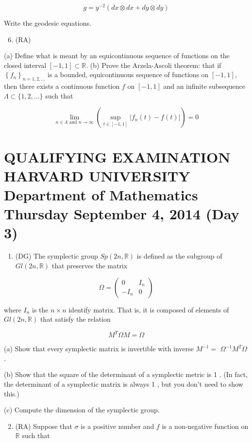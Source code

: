 \documentclass[10pt]{article}
\begin{document}
$$
g=y^{-2}(d x \otimes d x+d y \otimes d y)
$$

Write the geodesic equations.

\begin{enumerate}
  \setcounter{enumi}{5}
  \item (RA)
\end{enumerate}

(a) Define what is meant by an equicontinuous sequence of functions on the closed interval $[-1,1] \subset \mathbb{R}$.
(b) Prove the Arzela-Ascoli theorem: that if $\left\{f_{n}\right\}_{n=1,2, \ldots}$ is a bounded, equicontinuous sequence of functions on $[-1,1]$, then there exists a continuous function $f$ on $[-1,1]$ and an infinite subsequence $\Lambda \subset\{1,2, \ldots\}$ such that

$$
\lim _{n \in \Lambda \text { and } n \rightarrow \infty}\left(\sup _{t \in[-1,1]}\left|f_{n}(t)-f(t)\right|\right)=0
$$

\section{QUALIFYING EXAMINATION 
 HARVARD UNIVERSITY 
 Department of Mathematics 
 Thursday September 4, 2014 (Day 3)}
\begin{enumerate}
  \item (DG) The symplectic group $S p(2 n, \mathbb{R})$ is defined as the subgroup of $G l(2 n, \mathbb{R})$ that preserves the matrix
\end{enumerate}

$$
\Omega=\left(\begin{array}{cc}
0 & I_{n} \\
-I_{n} & 0
\end{array}\right)
$$

where $I_{n}$ is the $n \times n$ identify matrix. That is, it is composed of elements of $G l(2 n, \mathbb{R})$ that satisfy the relation

$$
M^{T} \Omega M=\Omega
$$

(a) Show that every symplectic matrix is invertible with inverse $M^{-1}=$ $\Omega^{-1} M^{T} \Omega$.

(b) Show that the square of the determinant of a symplectic metric is 1 . (In fact, the determinant of a symplectic matrix is always 1 , but you don't need to show this.)

(c) Compute the dimension of the symplectic group.

\begin{enumerate}
  \setcounter{enumi}{1}
  \item (RA) Suppose that $\sigma$ is a positive number and $f$ is a non-negative function on $\mathbb{R}$ such that
\end{enumerate}
\end{document}
